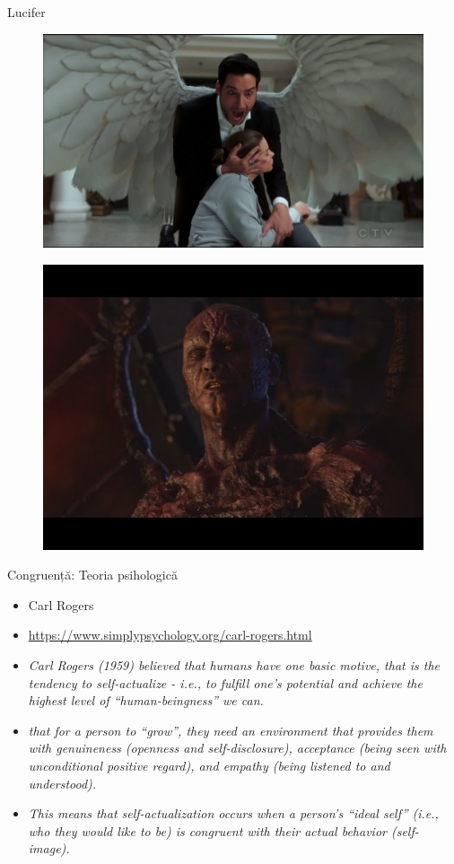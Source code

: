 \documentclass{simple}
\begin{document}
\begin{frame}[fragile]{Lucifer}
  \begin{figure}
    \centering
    \includegraphics[width=0.55\linewidth]{img/lucifer-wings}
  \end{figure}
  \begin{figure}
    \centering
    \includegraphics[width=0.55\linewidth]{img/lucifer-devil-form}
  \end{figure}
\end{frame}

\begin{frame}{Congruență: Teoria psihologică}
  \begin{itemize}
    \pause
    \item Carl Rogers
    \pause
    \item \url{https://www.simplypsychology.org/carl-rogers.html}
    \pause
    \item \textit{Carl Rogers (1959) believed that humans have one basic motive, that is the tendency to self-actualize - i.e., to fulfill one's potential and achieve the highest level of ``human-beingness'' we can.}
    \pause
    \item \textit{that for a person to ``grow'', they need an environment that provides them with genuineness (openness and self-disclosure), acceptance (being seen with unconditional positive regard), and empathy (being listened to and understood).}
    \pause
    \item \textit{This means that self-actualization occurs when a person's ``ideal self'' (i.e., who they would like to be) is congruent with their actual behavior (self-image).}
  \end{itemize}
\end{frame}
\end{document}
